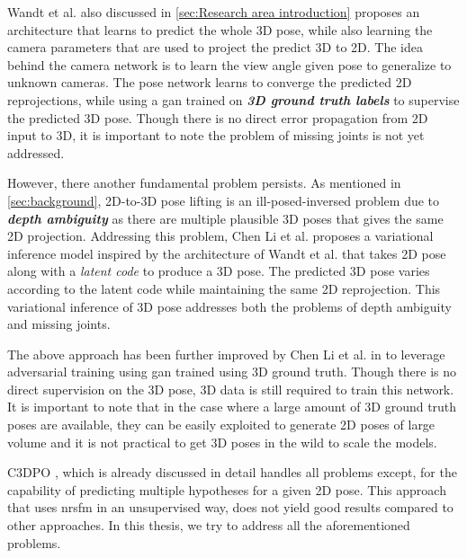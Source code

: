 Wandt et al. \cite{repnet} also discussed in \ref{sec:Research area introduction} proposes an architecture that learns to predict the whole 3D pose, while also learning the camera parameters that are used to project the predict 3D to 2D. The idea behind the camera network is to learn the view angle given pose to generalize to unknown cameras. The pose network learns to converge the predicted 2D reprojections, while using a \ac{gan} trained on \textit{\textbf{3D ground truth labels}} to supervise the predicted 3D pose. Though there is no direct error propagation from 2D input to 3D, it is important to note the problem of missing joints is not yet addressed.

However, there another fundamental problem persists. As mentioned in \ref{sec:background}, 2D-to-3D pose lifting is an ill-posed-inversed problem due to \textit{\textbf{depth ambiguity}} as there are multiple plausible 3D poses that gives the same 2D projection. Addressing this problem, Chen Li et al. \cite{multiplehypo} proposes a variational inference model inspired by the architecture of Wandt et al. \cite{repnet} that takes 2D pose along with a \textit{latent code} to produce a 3D pose. The predicted 3D pose varies according to the latent code while maintaining the same 2D reprojection. This variational inference of 3D pose addresses both the problems of depth ambiguity and missing joints.

The above approach has been further improved by Chen Li et al. in \cite{weaklymultiple} to leverage adversarial training using \ac{gan} trained using 3D ground truth. Though there is no direct supervision on the 3D pose, 3D data is still required to train this network. It is important to note that in the case where a large amount of 3D ground truth poses are available, they can be easily exploited to generate 2D poses of large volume and it is not practical to get 3D poses in the wild to scale the models.

C3DPO \cite{c3dpo}, which is already discussed in detail handles all problems except, for the capability of predicting multiple hypotheses for a given 2D pose. This approach that uses \ac{nrsfm} in an unsupervised way, does not yield good results compared to other approaches. In this thesis, we try to address all the aforementioned problems.
